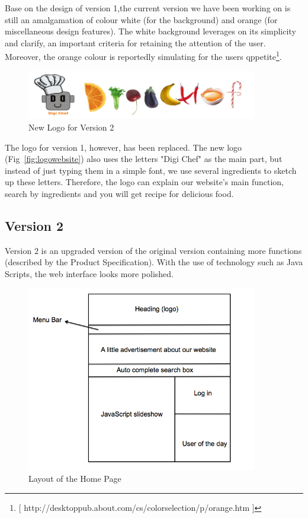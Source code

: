 Base on the design of version 1,the current version we have been working on is still an amalgamation of colour white (for the background) and orange (for miscellaneous design features). The white background leverages on its simplicity and clarify, an important criteria for retaining the attention of the user. Moreover, the orange colour is reportedly simulating for the users qppetite\footnote{[ http://desktoppub.about.com/cs/colorselection/p/orange.htm ]}. 

\begin{figure}[h]
\includegraphics[width=0.9\textwidth]{logowebsite}
\caption{New Logo for Version 2}
\end{figure}

The logo for version 1, however, has been replaced. The new logo (Fig~\ref{fig:logowebsite}) also uses the letters "Digi Chef" as the main part, but instead of just typing them in a simple font, we use several ingredients to sketch up these letters. Therefore, the logo can explain our website's main function, search by ingredients and you will get  recipe for delicious food. 

\subsection{Version 2}

Version 2 is an upgraded version of the original version containing more functions (described by the Product Specification). With the use of technology such as Java Scripts, the web interface looks more polished. 

\begin{figure}[h]
\includegraphics[width=0.9\textwidth]{home_page_v2}
\caption{Layout of the Home Page}
\label{fig:home_page}
\end{figure}

